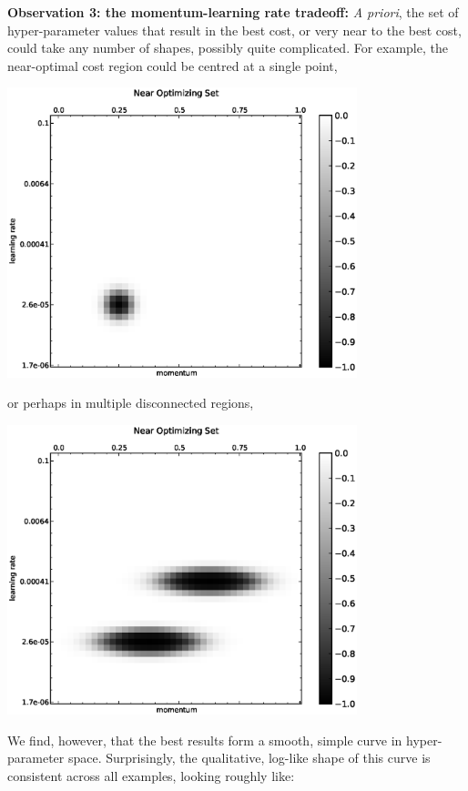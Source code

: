 \documentclass[10pt]{article}
\begin{document}
\textbf{Observation 3: the momentum-learning rate tradeoff:} \emph{A
  priori}, the set of hyper-parameter values that result in the best
cost, or very near to the best cost, could take any number of shapes,
possibly quite complicated. For example, the near-optimal cost region
could be centred at a single point,
%
\begin{center}
\includegraphics[width=4in]{plots/detailed/OptimalPretend1.eps}
\end{center}
%
or perhaps in multiple disconnected regions,
%
\begin{center}
\includegraphics[width=4in]{plots/detailed/OptimalPretend2.eps}
\end{center}
%
We find, however, that the best results form a smooth, simple curve in
hyper-parameter space.  Surprisingly, the qualitative, log-like shape
of this curve is consistent across all examples, looking roughly like: 
%
\end{document}
